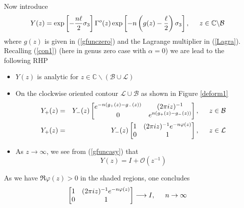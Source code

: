 \documentclass[10pt,oneside,reqno]{amsart}
\numberwithin{equation}{section}
\def\eqref#1{(\ref{#1})}
\begin{document}
Now introduce
\begin{equation*}
  Y(z) = \exp\left[-\frac{n\ell}{2}\sigma_3\right]\Gamma^o(z)\exp\left[-n\left(g(z)-\frac{\ell}{2}\right)\sigma_3\right],\hspace{0.5cm}z\in\mathbb{C}\backslash\mathcal{B}
\end{equation*}
where $g(z)$ is given in \eqref{gfunczero} and the Lagrange multiplier in \eqref{Lagra}. Recalling \eqref{con1} (here in genus zero case with $\alpha=0$) we are lead to the
following RHP
\begin{itemize}
 \item $Y(z)$ is analytic for $z\in\mathbb{C}\backslash\left(\mathcal{B}\cup\mathcal{L}\right)$
 \item On the clockwise oriented contour $\mathcal{L}\cup\mathcal{B}$ as shown in Figure \ref{deform1}
  \begin{eqnarray*}
    Y_+(z) &=& Y_-(z)\begin{bmatrix}
				 e^{-n(g_+(z)-g_-(z))} & (2\pi i z)^{-1}\\
  0 & e^{n(g_+(z)-g_-(z))}
                               \end{bmatrix},\hspace{0.5cm}z\in\mathcal{B}\\
  Y_+(z) &=& Y_-(z)\begin{bmatrix}
                                1 & (2\pi iz)^{-1}e^{-n\varphi(z)}\\
  0 & 1\\
                               \end{bmatrix},\hspace{0.5cm}z\in\mathcal{L}
  \end{eqnarray*}
  \item As $z\rightarrow\infty$, we see from \eqref{gfuncasy} that
  \begin{equation*}
    Y(z) = I+\mathcal O\left(z^{-1}\right)
  \end{equation*}
\end{itemize}
As we have $\Re\varphi(z)>0$ in the  shaded regions, one concludes
\begin{equation}\label{esti1}
 \begin{bmatrix}
                                1 & (2\pi iz)^{-1}e^{-n\varphi(z)}\\
  0 & 1\\
                               \end{bmatrix}\longrightarrow I,\hspace{0.5cm}n\rightarrow\infty
\end{equation}
\end{document}
